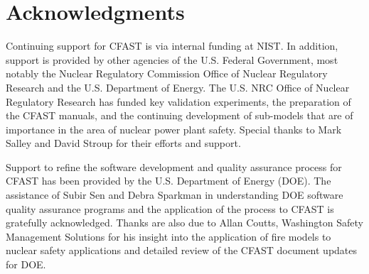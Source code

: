 \documentclass[12pt]{book}
\begin{document}
\chapter{Acknowledgments}

\label{acksection}

Continuing support for CFAST is via internal funding at NIST. In addition, support is provided by other agencies of the U.S. Federal Government, most notably the Nuclear Regulatory Commission Office of Nuclear Regulatory Research and the U.S. Department of Energy. The U.S. NRC Office of Nuclear Regulatory Research has funded key validation experiments, the preparation of the CFAST manuals, and the continuing development of sub-models that are of importance in the area of nuclear power plant safety. Special thanks to Mark Salley and David Stroup for their efforts and support.

Support to refine the software development and quality assurance process for CFAST has been provided by the U.S. Department of Energy (DOE). The assistance of Subir Sen and Debra Sparkman in understanding DOE software quality assurance programs and the application of the process to CFAST is gratefully acknowledged. Thanks are also due to Allan Coutts, Washington Safety Management Solutions for his insight into the application of fire models to nuclear safety applications and detailed review of the CFAST document updates for DOE.

\tableofcontents

\listoffigures

\mainmatter










\appendix
{}


\end{document}
